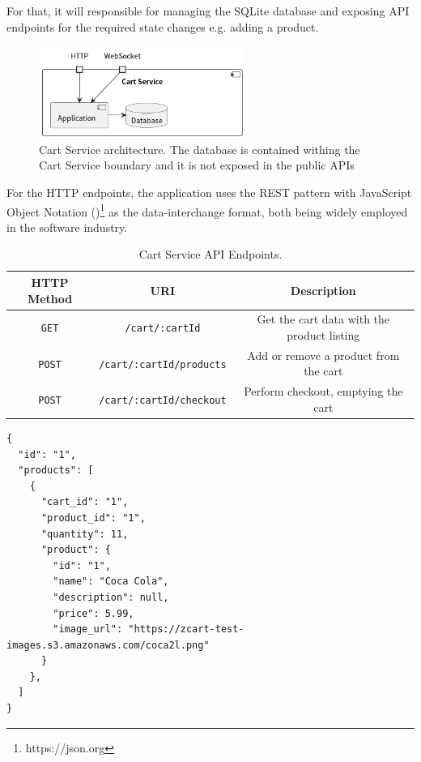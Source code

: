 \documentclass[openright]{normas-utf-tex} %
\begin{document}
For that, it will responsible for managing the SQLite database and exposing API
endpoints for the required state changes e.g. adding a product.

\begin{figure}[H]
	\centering
	\includegraphics[width=0.6\textwidth]{./images/diagrams/CartService.png}
    \caption[Cart Service architecture]{Cart Service architecture. The database
    is contained withing the Cart Service boundary and it is not exposed in the
    public APIs}
	\label{fig:dummy}
\end{figure}

For the HTTP endpoints, the application uses the REST \cite{Roy2000} pattern
with JavaScript Object Notation ()\footnote{https://json.org} as the data-interchange format, both
being widely employed in the software industry.

\begin{table}[H]
	\centering
	\label{tab:correlacao}
	\begin{tabular}{c | c|c}
		\hline 
        HTTP Method & URI & Description \\
		\hline
        \texttt{GET} & \texttt{/cart/:cartId} & Get the cart data with the product listing \\
        \texttt{POST} & \texttt{/cart/:cartId/products} & Add or remove a product from the cart \\
        \texttt{POST} & \texttt{/cart/:cartId/checkout} & Perform checkout, emptying the cart \\
		\hline 
	\end{tabular}
    \caption[Cart Service API endpoints]{Cart Service API Endpoints.}
\end{table}

\begin{lstlisting}[caption={Example response for the \texttt{GET /cart/:cartId} endpoint using JSON},label={lst:response}]
{
  "id": "1",
  "products": [
    {
      "cart_id": "1",
      "product_id": "1",
      "quantity": 11,
      "product": {
        "id": "1",
        "name": "Coca Cola",
        "description": null,
        "price": 5.99,
        "image_url": "https://zcart-test-images.s3.amazonaws.com/coca2l.png"
      }
    },
  ]
}
\end{lstlisting}
\end{document}
